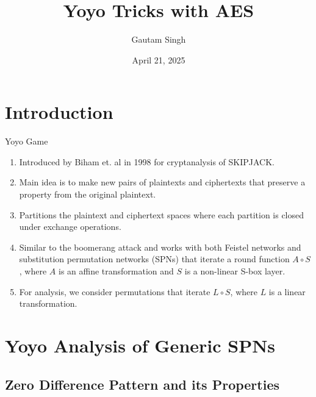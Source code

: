 \documentclass[notheorems]{beamer}
\title{Yoyo Tricks with AES}
\date{April 21, 2025}
\author{Gautam Singh}
\institute[IITH]{Indian Institute of Technology Hyderabad}
\theoremstyle{definition}
\theoremstyle{example}
\begin{document}
    
    \begin{frame}
        \titlepage
    \end{frame}
    
    \begin{frame}
        \tableofcontents
    \end{frame}
    
    \section{Introduction}
    \label{sec:intro}
    
    \begin{frame}[<+->]{Yoyo Game}
        \begin{enumerate}
            \item Introduced by Biham et. al in 1998 for cryptanalysis of
            SKIPJACK. %
            \item Main idea is to make new pairs of plaintexts and ciphertexts
            that preserve a property from the original plaintext.
            \item Partitions the plaintext and ciphertext spaces where each
            partition is closed under exchange operations.
            \item Similar to the boomerang attack and works with both Feistel
            networks and substitution permutation networks (SPNs) that iterate a
            round function \(A \circ S\), where \(A\) is an affine
            transformation and \(S\) is a non-linear S-box layer.
            \item For analysis, we consider permutations that iterate \(L \circ
            S\), where \(L\) is a linear transformation.
        \end{enumerate}
    \end{frame}

    \section{Yoyo Analysis of Generic SPNs}
    \label{sec:yoyo-generic-analysis}

    \subsection{Zero Difference Pattern and its Properties}
    \label{subsec:zero-diff-pattern}
    
\end{document}
